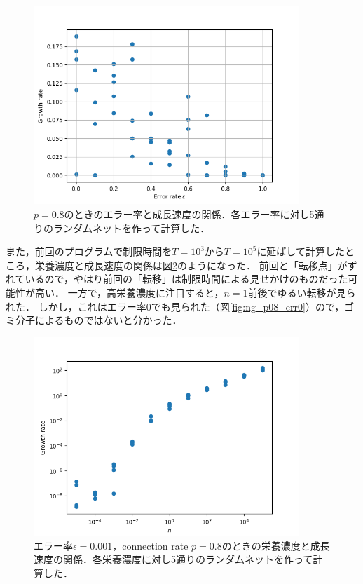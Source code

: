 \documentclass[a4paper,11pt]{jsarticle}
\begin{document}
\begin{figure}[htbp]
  \centering
  \includegraphics[width=10cm]{error_rate_growth_rate_N5_T5_p08_2.png}
  \caption{$p=0.8$のときのエラー率と成長速度の関係．各エラー率に対し5通りのランダムネットを作って計算した．}
  \label{fig:eg_p08}
\end{figure}

また，前回のプログラムで制限時間を$T=10^3$から$T=10^5$に延ばして計算したところ，栄養濃度と成長速度の関係は図\ref{fig:ng_p08}のようになった．
前回と「転移点」がずれているので，やはり前回の「転移」は制限時間による見せかけのものだった可能性が高い．
一方で，高栄養濃度に注目すると，$n=1$前後でゆるい転移が見られた．
しかし，これはエラー率0でも見られた（図\ref{fig:ng_p08_err0}）ので，ゴミ分子によるものではないと分かった．

\begin{figure}[htbp]
  \centering
  \includegraphics[width=10cm]{waste_N5_T5_p08_4.png}
  \caption{エラー率$\epsilon=0.001$，connection rate $p=0.8$のときの栄養濃度と成長速度の関係．各栄養濃度に対し5通りのランダムネットを作って計算した．}
  \label{fig:ng_p08}
\end{figure}
\end{document}
